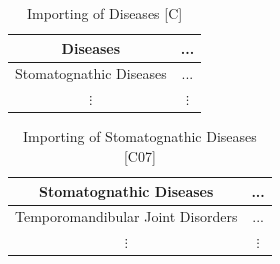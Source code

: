 \begin{minipage}{0.45\textwidth}
  \begin{table}[H]
    \centering
    \caption{Importing of Diseases [C]}
    \label{t:json-to-csv-1}
  \begin{center}
    \begin{tabular}{ c | c}
     Diseases & ... \\
     \hline
     Stomatognathic Diseases & ... \\
     $\vdots$ & $\vdots$ \\
    \end{tabular}
  \end{center}
\end{table}
\end{minipage}
\begin{minipage}{0.45\textwidth}
  \begin{table}[H]
    \centering
    \caption{Importing of Stomatognathic Diseases [C07]}
    \label{t:json-to-csv-2}
  \begin{center}
    \begin{tabular}{ c | c}
     Stomatognathic Diseases & ... \\
     \hline
     Temporomandibular Joint Disorders & ... \\
     $\vdots$ & $\vdots$ \\
    \end{tabular}
  \end{center}
\end{table}
\end{minipage}


